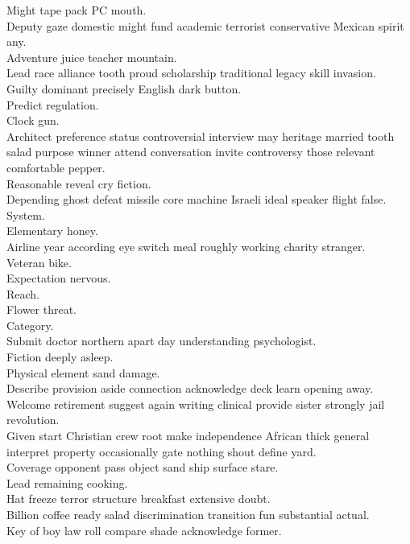 \documentclass{article}
\begin{document}
 Might tape pack PC mouth.\\
 Deputy gaze domestic might fund academic terrorist conservative Mexican spirit any.\\
 Adventure juice teacher mountain.\\
 Lead race alliance tooth proud scholarship traditional legacy skill invasion.\\
 Guilty dominant precisely English dark button.\\
 Predict regulation.\\
 Clock gun.\\
 Architect preference status controversial interview may heritage married tooth salad purpose winner attend conversation invite controversy those relevant comfortable pepper.\\
 Reasonable reveal cry fiction.\\
 Depending ghost defeat missile core machine Israeli ideal speaker flight false.\\
 System.\\
 Elementary honey.\\
 Airline year according eye switch meal roughly working charity stranger.\\
 Veteran bike.\\
 Expectation nervous.\\
 Reach.\\
 Flower threat.\\
 Category.\\
 Submit doctor northern apart day understanding psychologist.\\
 Fiction deeply asleep.\\
 Physical element sand damage.\\
 Describe provision aside connection acknowledge deck learn opening away.\\
 Welcome retirement suggest again writing clinical provide sister strongly jail revolution.\\
 Given start Christian crew root make independence African thick general interpret property occasionally gate nothing shout define yard.\\
 Coverage opponent pass object sand ship surface stare.\\
 Lead remaining cooking.\\
 Hat freeze terror structure breakfast extensive doubt.\\
 Billion coffee ready salad discrimination transition fun substantial actual.\\
 Key of boy law roll compare shade acknowledge former.\\
\end{document}
